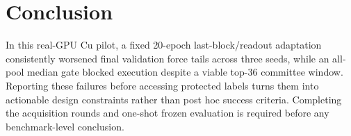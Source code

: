 \documentclass{article}
\begin{document}
\section{Conclusion}

In this real-GPU Cu pilot, a fixed 20-epoch last-block/readout adaptation consistently worsened final validation force tails across three seeds, while an all-pool median gate blocked execution despite a viable top-36 committee window. Reporting these failures before accessing protected labels turns them into actionable design constraints rather than post hoc success criteria. Completing the acquisition rounds and one-shot frozen evaluation is required before any benchmark-level conclusion.





\clearpage

\end{document}
